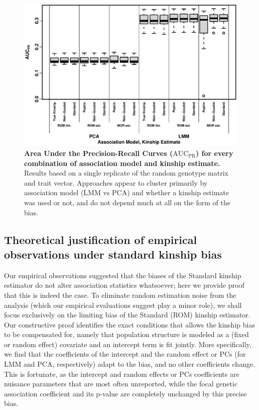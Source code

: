 \documentclass[11pt]{article}
\newcommand{\auc}{\text{AUC}_\text{PR}}
\begin{document}
\begin{figure}[bp!]
  \centering
  \includegraphics[width=\textwidth]{auc.pdf}
  \caption{
    {\bf Area Under the Precision-Recall Curves ($\auc$) for every combination of association model and kinship estimate.}
    Results based on a single replicate of the random genotype matrix and trait vector.
    Approaches appear to cluster primarily by association model (LMM vs PCA) and whether a kinship estimate was used or not, and do not depend much at all on the form of the bias.
  }
  \label{fig:auc_real}
\end{figure}




\subsection{Theoretical justification of empirical observations under standard kinship bias}

Our empirical observations suggested that the biases of the Standard kinship estimator do not alter association statistics whatsoever; here we provide proof that this is indeed the case.
To eliminate random estimation noise from the analysis (which our empirical evaluations suggest play a minor role), we shall focus exclusively on the limiting bias of the Standard (ROM) kinship estimator.
Our constructive proof identifies the exact conditions that allows the kinship bias to be compensated for, namely that population structure is modeled as a (fixed or random effect) covariate and an intercept term is fit jointly.
More specifically, we find that the coefficients of the intercept and the random effect or PCs (for LMM and PCA, respectively) adapt to the bias, and no other coefficients change.
This is fortunate, as the intercept and random effects or PCs coefficients are nuisance parameters that are most often unreported, while the focal genetic association coefficient and its p-value are completely unchanged by this precise bias.
\end{document}
